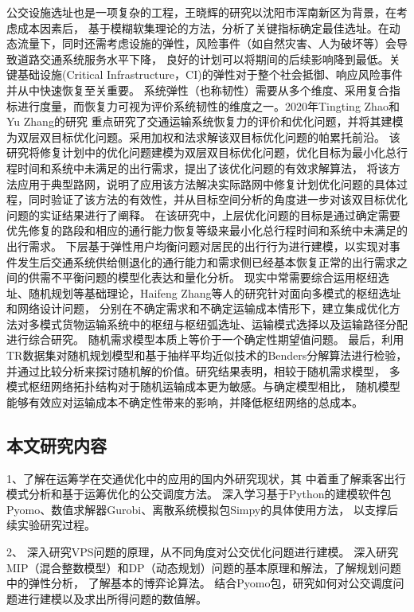 公交设施选址也是一项复杂的工程，王晓辉的研究\cite{snu2012}以沈阳市浑南新区为背景，在考虑成本因素后，
基于模糊软集理论的方法，分析了关键指标确定最佳选址。在动态流量下，同时还需考虑设施的弹性，风险事件（如自然灾害、人为破坏等）会导致道路交通系统服务水平下降，
良好的计划可以将期间的后续影响降到最低。关键基础设施(Critical Infrastructure，CI)的弹性对于整个社会抵御、响应风险事件并从中快速恢复至关重要。
系统弹性（也称韧性）需要从多个维度、采用复合指标进行度量，而恢复力可视为评价系统韧性的维度之一。2020年Tingting Zhao和Yu Zhang的研究\cite{ZHAO2020102700}
重点研究了交通运输系统恢复力的评价和优化问题，并将其建模为双层双目标优化问题。采用加权和法求解该双目标优化问题的帕累托前沿。
该研究将修复计划中的优化问题建模为双层双目标优化问题，优化目标为最小化总行程时间和系统中未满足的出行需求，提出了该优化问题的有效求解算法，
将该方法应用于典型路网，说明了应用该方法解决实际路网中修复计划优化问题的具体过程，同时验证了该方法的有效性，并从目标空间分析的角度进一步对该双目标优化问题的实证结果进行了阐释。
在该研究中，上层优化问题的目标是通过确定需要优先修复的路段和相应的通行能力恢复等级来最小化总行程时间和系统中未满足的出行需求。
下层基于弹性用户均衡问题对居民的出行行为进行建模，以实现对事件发生后交通系统供给侧退化的通行能力和需求侧已经基本恢复正常的出行需求之间的供需不平衡问题的模型化表达和量化分析。
现实中常需要综合运用枢纽选址、随机规划等基础理论，Haifeng Zhang等人的研究\cite{ZHANG2022108493}针对面向多模式的枢纽选址和网络设计问题，
分别在不确定需求和不确定运输成本情形下，建立集成优化方法对多模式货物运输系统中的枢纽与枢纽弧选址、运输模式选择以及运输路径分配进行综合研究。
随机需求模型本质上等价于一个确定性期望值问题。
最后，利用TR数据集对随机规划模型和基于抽样平均近似技术的Benders分解算法进行检验，
并通过比较分析来探讨随机解的价值。研究结果表明，相较于随机需求模型，
多模式枢纽网络拓扑结构对于随机运输成本更为敏感。与确定模型相比，
随机模型能够有效应对运输成本不确定性带来的影响，并降低枢纽网络的总成本。
\subsection{本文研究内容}
1、了解在运筹学在交通优化中的应用的国内外研究现状，其
中着重了解乘客出行模式分析和基于运筹优化的公交调度方法。
深入学习基于Python的建模软件包Pyomo、数值求解器Gurobi、离散系统模拟包Simpy的具体使用方法，
以支撑后续实验研究过程。

2、 深入研究VPS问题的原理，从不同角度对公交优化问题进行建模。
深入研究MIP（混合整数模型）和DP（动态规划）问题的基本原理和解法，了解规划问题中的弹性分析，
了解基本的博弈论算法。
结合Pyomo包，研究如何对公交调度问题进行建模以及求出所得问题的数值解。

